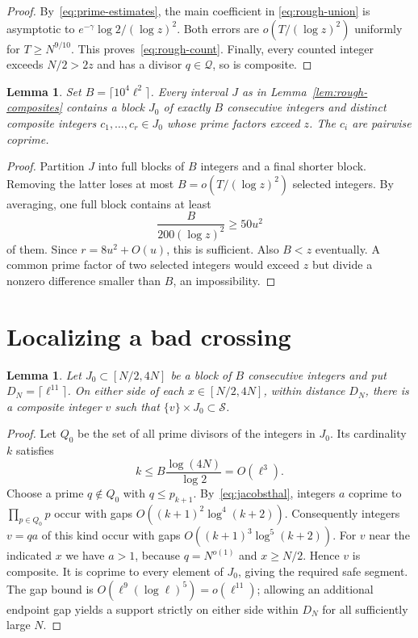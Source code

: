 \documentclass[11pt]{article}
\newtheorem{lemma}[theorem]{Lemma}
\theoremstyle{definition}
\theoremstyle{remark}
\newcommand{\cS}{\mathcal S}
\begin{document}
\begin{proof}
By~\eqref{eq:prime-estimates}, the main coefficient in
\eqref{eq:rough-union} is asymptotic to
$e^{-\gamma}\log2/(\log z)^2$.
Both errors are $o(T/(\log z)^2)$ uniformly for $T\geq N^{9/10}$.
This proves~\eqref{eq:rough-count}. Finally, every counted integer exceeds
$N/2>2z$ and has a divisor $q\in\mathcal Q$, so is composite.
\end{proof}

\begin{lemma}\label{lem:band}
Set $B=\lceil10^4\ell^2\rceil$. Every interval $J$ as in
Lemma~\ref{lem:rough-composites} contains a block $J_0$ of exactly $B$
consecutive integers and distinct composite integers $c_1,\ldots,c_r\in J_0$
whose prime factors exceed $z$. The $c_i$ are pairwise coprime.
\end{lemma}
\begin{proof}
Partition $J$ into full blocks of $B$ integers and a final shorter block.
Removing the latter loses at most $B=o(T/(\log z)^2)$ selected integers.
By averaging, one full block contains at least
\[
             \frac{B}{200(\log z)^2}\geq50u^2
\]
of them. Since $r=8u^2+O(u)$, this is sufficient.
Also $B<z$ eventually. A common prime factor of two selected integers
would exceed $z$ but divide a nonzero difference smaller than $B$, an
impossibility.
\end{proof}

\section{Localizing a bad crossing}

\begin{lemma}\label{lem:supports}
Let $J_0\subset[N/2,4N]$ be a block of $B$ consecutive integers and put
$D_N=\lceil\ell^{11}\rceil$. On either side of each $x\in[N/2,4N]$,
within distance $D_N$, there is a composite integer $v$ such that
$\{v\}\times J_0\subset\cS$.
\end{lemma}
\begin{proof}
Let $Q_0$ be the set of all prime divisors of the integers in $J_0$.
Its cardinality $k$ satisfies
\[
                   k\leq B\frac{\log(4N)}{\log2}=O(\ell^3).
\]
Choose a prime $q\notin Q_0$ with $q\leq p_{k+1}$.
By~\eqref{eq:jacobsthal}, integers $a$ coprime to $\prod_{p\in Q_0}p$
occur with gaps $O((k+1)^2\log^4(k+2))$.
Consequently integers $v=qa$ of this kind occur with gaps
$O((k+1)^3\log^5(k+2))$.
For $v$ near the indicated $x$ we have $a>1$, because $q=N^{o(1)}$ and
$x\geq N/2$. Hence $v$ is composite. It is coprime to every element of
$J_0$, giving the required safe segment.
The gap bound is $O(\ell^9(\log\ell)^5)=o(\ell^{11})$; allowing an
additional endpoint gap yields a support strictly on either side within
$D_N$ for all sufficiently large $N$.
\end{proof}
\end{document}
